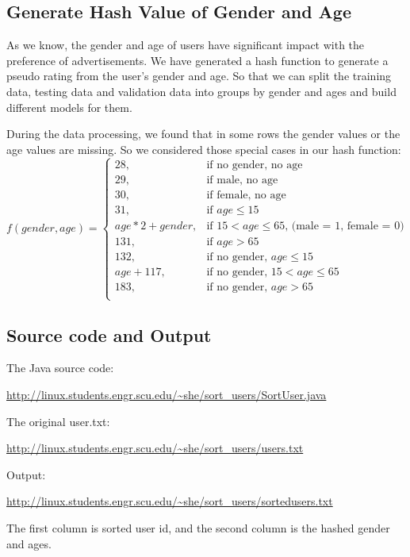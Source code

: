 \documentclass{article} %
\begin{document}
\subsection{Generate Hash Value of Gender and Age}
As we know, the gender and age of users have significant impact with the preference of advertisements. We have generated a hash function to generate a pseudo rating from the user's gender and age. So that we can split the training data, testing data and validation data into groups by gender and ages and build different models for them.

During the data processing, we found that in some rows the gender values or the age values are missing. So we considered those special cases in our hash function:
\[
    f(gender, age)= 
\begin{cases}
    28,& \text{if no gender, no age} \\
    29,              & \text{if male, no age}\\
    30, &\text{if female, no age}\\
    31, &\text{if } age\leq 15\\
    age*2 + gender, &\text{if } 15 < age \leq 65 \text{, (male = 1, female = 0)} \\
    131, &\text{if } age > 65 \\
    132, &\text{if no gender, } age \leq 15 \\
    age + 117, &\text{if no gender, } 15 < age \leq 65\\
    183, &\text{if no gender, } age > 65\\
\end{cases}
\]

\subsection{Source code and Output}
The Java source code:
\begin{center}
  \url{http://linux.students.engr.scu.edu/~she/sort_users/SortUser.java}
\end{center}

The original user.txt:
\begin{center}
  \url{http://linux.students.engr.scu.edu/~she/sort_users/users.txt}
\end{center}

Output:
\begin{center}
   \url{http://linux.students.engr.scu.edu/~she/sort_users/sortedusers.txt}
\end{center}
The first column is sorted user id, and the second column is the hashed gender and ages.
\end{document}
